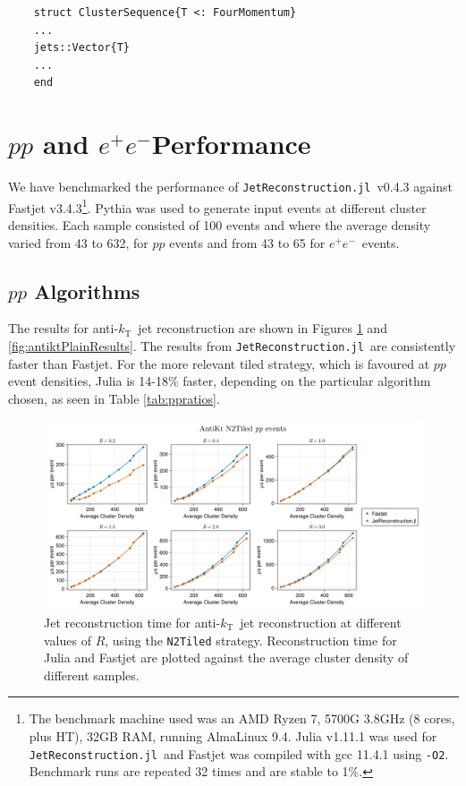 \documentclass{webofc}
\newcommand{\akt}{anti-${k}_\text{T}$}
\newcommand{\JR}{\texttt{JetReconstruction.jl}}
\newcommand{\ee}{$e^+e^-$}
\begin{document}
\begin{verbatim}
    struct ClusterSequence{T <: FourMomentum}
    ...
    jets::Vector{T}
    ...
    end
\end{verbatim}

\section{$pp$ and \ee Performance}
\label{sec:performance}

We have benchmarked the performance of \JR\ v0.4.3 against Fastjet v3.4.3\footnote{The benchmark machine used was an AMD Ryzen 7, 5700G 3.8GHz (8 cores, plus HT), 32GB RAM, running AlmaLinux 9.4. Julia v1.11.1 was used for \JR\ and Fastjet was compiled with gcc 11.4.1 using \texttt{-O2}. Benchmark runs are repeated 32 times and are stable to 1\%.}. Pythia was used to generate input events at different cluster densities. Each sample consisted of 100 events and where the average density varied from 43 to 632, for $pp$ events and from 43 to 65 for \ee\ events.

\subsection{$pp$ Algorithms}

The results for \akt\ jet reconstruction are shown in Figures
\ref{fig:antiktTiledResults} and \ref{fig:antiktPlainResults}. The results from
\JR\ are consistently faster than Fastjet. For the more relevant tiled strategy,
which is favoured at $pp$ event densities, Julia is 14-18\% faster, depending on
the particular algorithm chosen, as seen in Table \ref{tab:ppratios}.

\begin{figure}[h]
    \begin{center}
        \includegraphics[width=0.8\linewidth]{Alma9-AMD-Ryzen7-Julia-Fastjet-AntiKt-N2Tiled-MultiR.png}
        \caption{Jet reconstruction time for \akt\ jet reconstruction at different values of $R$, using the \texttt{N2Tiled} strategy. Reconstruction time for Julia and Fastjet are plotted against the average cluster density of different samples.}
        \label{fig:antiktTiledResults}
    \end{center}
\end{figure}
\end{document}
